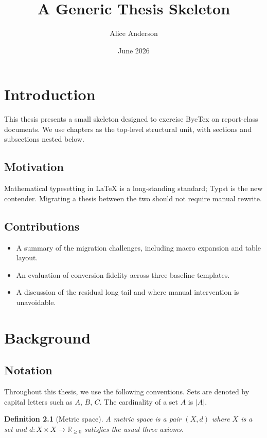 \documentclass[12pt,a4paper]{report}
\title{A Generic Thesis Skeleton}
\author{Alice Anderson}
\date{June 2026}
\newtheorem{definition}[theorem]{Definition}
\begin{document}
\maketitle

\tableofcontents

\listoffigures

\chapter{Introduction}

This thesis presents a small skeleton designed to exercise ByeTex on report-class
documents. We use chapters as the top-level structural unit, with sections and
subsections nested below.

\section{Motivation}

Mathematical typesetting in LaTeX is a long-standing standard; Typst is the new
contender. Migrating a thesis between the two should not require manual rewrite.

\section{Contributions}

\begin{itemize}
\item A summary of the migration challenges, including macro expansion and table layout.
\item An evaluation of conversion fidelity across three baseline templates.
\item A discussion of the residual long tail and where manual intervention is unavoidable.
\end{itemize}

\chapter{Background}

\section{Notation}

Throughout this thesis, we use the following conventions. Sets are denoted by
capital letters such as $A$, $B$, $C$. The cardinality of a set $A$ is $|A|$.

\begin{definition}[Metric space]
A metric space is a pair $(X, d)$ where $X$ is a set and $d : X \times X \to
\mathbb{R}_{\geq 0}$ satisfies the usual three axioms.
\end{definition}
\end{document}
